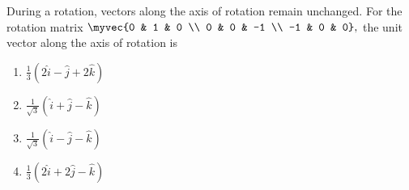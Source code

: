 \item During a rotation, vectors along the axis of rotation remain unchanged. For the rotation matrix
	$
\myvec{0 & 1 & 0 \\ 0 & 0 & -1 \\ -1 & 0 & 0},
$ the unit vector along the axis of rotation is
\hfill{}
\begin{multicols}{4}
\begin{enumerate}
\item $\frac{1}{3} (2 \hat{i} - \hat{j} + 2 \hat{k})$
\item $\frac{1}{\sqrt{3}} (\hat{i} + \hat{j} - \hat{k})$
\item $\frac{1}{\sqrt{3}} (\hat{i} - \hat{j} - \hat{k})$
\item $\frac{1}{3} (2 \hat{i} + 2 \hat{j} - \hat{k})$
\end{enumerate}
\end{multicols}

